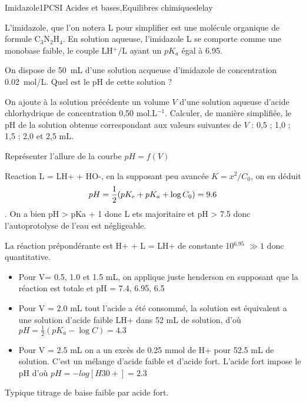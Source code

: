 
\begin{exercise}{Imidazole}{1}{PCSI}
{Acides et bases,Equilibres chimiques}{lelay}

L’imidazole, que l’on notera L pour simplifier est une molécule organique de formule C$_3$N$_2$H$_4$. En solution aqueuse, l’imidazole L se comporte comme une monobase faible, le couple LH$^+$/L ayant un $pK_a$ égal à 6.95.

\begin{questions}

    \question On dispose de 50~mL d'une solution acqueuse d'imidazole de concentration 0.02~mol/L. Quel est le pH de cette solution ?

    \question On ajoute à la solution précédente un volume $V$ d’une solution aqueuse d’acide chlorhydrique de concentration 0,50 mol.L$^{-1}$. Calculer, de manière simplifiée, le pH de la solution obtenue correspondant aux valeurs suivantes de $V$ : 0,5 ; 1,0 ; 1,5 ; 2,0 et 2,5 mL.

    \question Représenter l'allure de la courbe $pH = f(V)$
    
\end{questions}
\end{exercise}

\begin{solution}
\begin{questions}

    \question Reaction L = LH+ + HO-, en la supposant peu avancée $K = x^2 / C_0$, on en déduit 
    $$ pH = \frac12\qty( pK_e + pK_a +\log C_0) = 9.6 $$. On a bien pH > pKa + 1 donc L ets majoritaire et pH > 7.5 donc l'autoprotolyse de l'eau est négligeable.
    
    \question La réaction prépondérante est H+ + L = LH+ de constante 10$^{6.95}$ $\gg 1$ donc quantitative.
    \begin{itemize}
        \item Pour V= 0.5, 1.0 et 1.5 mL, on applique juste henderson en supposant que la réaction est totale et pH = 7.4, 6.95, 6.5
        \item Pour V = 2.0 mL tout l'acide a été consommé, la solution est équivalent a une solution d'acide faible LH+ dans 52 mL de solution, d'où $pH = \frac12(pK_a - \log C) = 4.3$
        
        \item Pour V = 2.5 mL on a un excès de 0.25 mmol de H+ pour 52.5 mL de solution. C'est un mélange d'acide faible et d'acide fort. L'acide fort impose le pH d'où $pH = -log [H30+] = 2.3$
    \end{itemize}
    
    \question Typique titrage de baise faible par acide fort.
    
\end{questions}
\end{solution}

